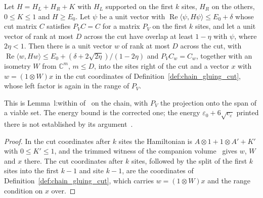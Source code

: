 \begin{lemma}
    \label{thm:chain_trimmed_witness}
    \leanok
    Let $H=H_L+H_R+K$ with $H_L$ supported on the first $k$ sites, $H_R$ on
    the others, $0\le K\le1$ and $H\ge E_0$. Let $\psi$ be a unit vector with
    $\operatorname{Re}\langle\psi,H\psi\rangle\le E_0+\delta$ whose cut matrix
    $C$ satisfies $P_VC=C$ for a matrix $P_V$ on the first $k$ sites, and let a
    unit vector of rank at most $D$ across the cut have overlap at least
    $1-\eta$ with $\psi$, where $2\eta<1$. Then there is a unit vector $w$ of
    rank at most $D$ across the cut, with
    $\operatorname{Re}\langle w,Hw\rangle\le E_0+(\delta+2\sqrt{2\eta})/(1-2\eta)$
    and $P_VC_w=C_w$, together with an isometry $W$ from $\mathbb C^m$, $m\le D$,
    into the sites right of the cut and a vector $x$ with $w=(1\otimes W)x$ in
    the cut coordinates of Definition~\ref{def:chain_gluing_cut}, whose left
    factor is again in the range of $P_V$.

    This is Lemma~l:within of~\cite[lines 509--515]{Landau2015Polynomial} on
    the chain, with $P_V$ the projection onto the span of a viable set. The
    energy bound is the corrected one; the energy
    $\varepsilon_0+6\sqrt{c_\varepsilon}$ printed there is not established by its
    argument~\cite{gap:lvv13_trimming_energy}.
\end{lemma}

\begin{proof}
    \leanok
    In the cut coordinates after $k$ sites the Hamiltonian is
    $A\otimes1+1\otimes A'+K'$ with $0\le K'\le1$, and the trimmed witness of
    the companion volume~\cite[``A trimmed low-energy witness on a
        subspace'']{QICLean2026Blueprint} gives $w$, $W$ and $x$ there. The cut
    coordinates after $k$ sites, followed by the split of the first $k$ sites
    into the first $k-1$ and site $k-1$, are the coordinates of
    Definition~\ref{def:chain_gluing_cut}, which carries $w=(1\otimes W)x$ and the
    range condition on $x$ over.
\end{proof}


